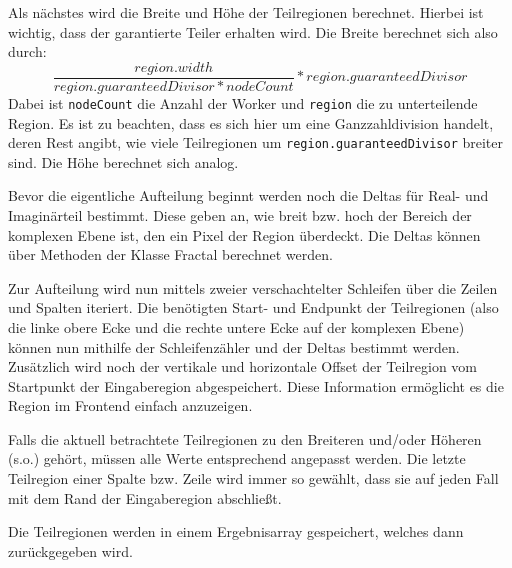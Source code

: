 Als nächstes wird die Breite und Höhe der Teilregionen berechnet. Hierbei ist wichtig, dass der garantierte Teiler erhalten wird.
Die Breite berechnet sich also durch:
\begin{equation*}
	\frac{region.width}{region.guaranteedDivisor * nodeCount} * region.guaranteedDivisor
\end{equation*}
Dabei ist \verb|nodeCount| die Anzahl der Worker und \verb|region| die zu unterteilende Region.
Es ist zu beachten, dass es sich hier um eine Ganzzahldivision handelt, deren Rest angibt, wie viele Teilregionen um \verb|region.guaranteedDivisor| breiter sind.
Die Höhe berechnet sich analog.

Bevor die eigentliche Aufteilung beginnt werden noch die Deltas für Real- und Imaginärteil bestimmt.
Diese geben an, wie breit bzw. hoch der Bereich der komplexen Ebene ist, den ein Pixel der Region überdeckt.
Die Deltas können über Methoden der Klasse Fractal berechnet werden.

Zur Aufteilung wird nun mittels zweier verschachtelter Schleifen über die Zeilen und Spalten iteriert.
Die benötigten Start- und Endpunkt der Teilregionen (also die linke obere Ecke und die rechte untere Ecke auf der komplexen Ebene) können nun mithilfe der Schleifenzähler und der Deltas bestimmt werden.
Zusätzlich wird noch der vertikale und horizontale Offset der Teilregion vom Startpunkt der Eingaberegion abgespeichert. Diese Information ermöglicht es die Region im Frontend einfach anzuzeigen.

Falls die aktuell betrachtete Teilregionen zu den Breiteren und/oder Höheren (s.o.) gehört, müssen alle Werte entsprechend angepasst werden.
Die letzte Teilregion einer Spalte bzw. Zeile wird immer so gewählt, dass sie auf jeden Fall mit dem Rand der Eingaberegion abschließt.

Die Teilregionen werden in einem Ergebnisarray gespeichert, welches dann zurückgegeben wird.

